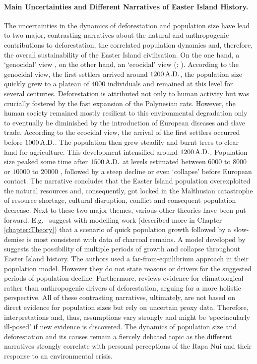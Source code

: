 \paragraph{Main Uncertainties and Different Narratives of Easter Island History.}
The uncertainties in the dynamics of deforestation and population size have lead to two major, contrasting narratives about the natural and anthropogenic contributions to deforestation, the correlated population dynamics and, therefore, the overall sustainability of the Easter Island civilisation.
On the one hand, a `genocidal' view \citep{Hunt2007}, on the other hand, an `ecocidal' view (; ).
According to the genocidal view, the first settlers arrived around $1200\,{\rm A.D.}$, the population size quickly grew to a plateau of $4000$ individuals and remained at this level for several centuries. Deforestation is attributed not only to human activity but was crucially fostered by the fast expansion of the Polynesian rats. 
However, the human society remained mostly resilient to this environmental degradation only to eventually be diminished by the introduction of European diseases and slave trade. 
According to the ecocidal view, the arrival of the first settlers occurred before $1000\, {\rm A.D.}$. 
The population then grew steadily and burnt trees to clear land for agriculture. This development intensified around $1200\, {\rm A.D.}$. 
Population size peaked some time after $1500\, {\rm A.D.}$ at levels estimated between $6000$ to $8000$ or $10000$ to $20000$ \citep{Bahn2017}, followed by a steep decline or even `collapse' \citep{Diamond2011} before European contact.
The narrative concludes that the Easter Island population overexploited the natural resources and, consequently, got locked in the Malthusian catastrophe of resource shortage, cultural disruption, conflict and consequent population decrease.
Next to these two major themes, various other theories have been put forward.
E.g.\ \citet{Brandt2015} suggest with modelling work (described more in Chapter \ref{chapter:Theory}) that a scenario of quick population growth followed by a slow-demise is most consistent with data of charcoal remains. 
A model developed by \citet{Cole2008} suggests the possibility of multiple periods of growth and collapse throughout Easter Island history. 
The authors used a far-from-equilibrium approach in their population model.
However they do not state reasons or drivers for the suggested periods of population decline. 
Furthermore, \citet{Rull2016} reviews evidence for climatological rather than anthropogenic drivers of deforestation, arguing for a more holistic perspective.
All of these contrasting narratives, ultimately, are not based on direct evidence for population sizes but rely on uncertain proxy data. 
Therefore, interpretations and, thus, assumptions vary strongly and might be `spectacularly ill-posed' \citep{Merico2017} if new evidence is discovered.
The dynamics of population size and deforestation and its causes remain a fiercely debated topic as the different narratives strongly correlate with personal perceptions of the Rapa Nui and their response to an environmental crisis. 



